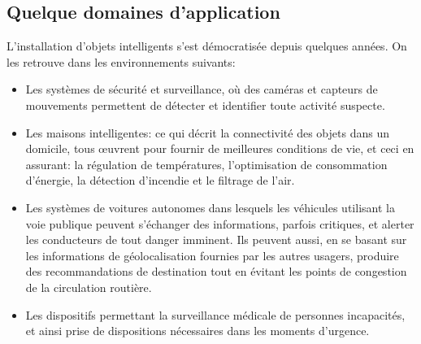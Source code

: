 \subsection{Quelque domaines d'application}
L'installation d'objets intelligents s'est démocratisée depuis quelques années. On les retrouve dans les environnements suivants:
\begin{itemize}
  \item Les systèmes de sécurité et surveillance, où des caméras et capteurs de mouvements permettent de détecter et identifier toute activité suspecte.
  \item Les maisons intelligentes: ce qui décrit la connectivité des objets dans un domicile, tous œuvrent pour fournir de meilleures conditions de vie, et ceci en assurant: la régulation de températures, l'optimisation de consommation d'énergie, la détection d'incendie et le filtrage de l'air.
  \item Les systèmes de voitures autonomes dans lesquels les véhicules utilisant la voie publique peuvent s'échanger des informations, parfois critiques, et alerter les conducteurs de tout danger imminent. Ils peuvent aussi, en se basant sur les informations de géolocalisation fournies par les autres usagers, produire des recommandations de destination tout en évitant les points de congestion de la circulation routière.
  \item Les dispositifs permettant la surveillance médicale de personnes incapacités, et ainsi prise de dispositions nécessaires dans les moments d'urgence.
\end{itemize}

